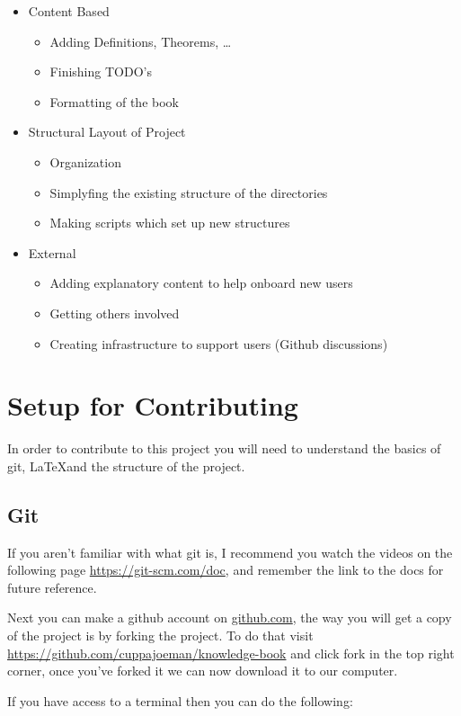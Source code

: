 \begin{itemize}
  \item Content Based 
  \begin{itemize}
      \item Adding Definitions, Theorems, \ldots
      \item Finishing TODO's
      \item Formatting of the book
  \end{itemize}
  \item Structural Layout of Project 
  \begin{itemize}
      \item Organization
      \item Simplyfing the existing structure of the directories 
      \item Making scripts which set up new structures
  \end{itemize}
  \item External
  \begin{itemize}
      \item Adding explanatory content to help onboard new users
      \item Getting others involved
      \item Creating infrastructure to support users (Github discussions)
  \end{itemize}
\end{itemize}

\section*{Setup for Contributing}
In order to contribute to this project you will need to understand the basics of git, \LaTeX and the structure of the project.

\subsection*{Git}
If you aren't familiar with what git is, I recommend you watch the videos on the following page \url{https://git-scm.com/doc}, and remember the link to the docs for future reference. 

Next you can make a github account on \url{github.com}, the way you will get a copy of the project is by forking the project. To do that visit \url{https://github.com/cuppajoeman/knowledge-book} and click fork in the top right corner, once you've forked it we can now download it to our computer.

If you have access to a terminal then you can do the following:

